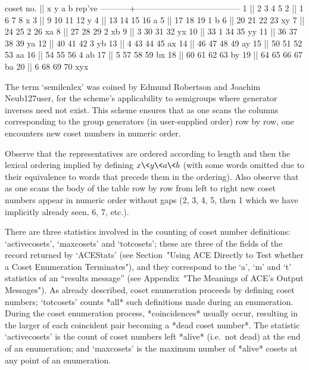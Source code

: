 \begintt
 coset no. ||      x      y      a      b    rep've
-----------+--------------------------------------
         1 ||      2      3      4      5
         2 ||      1      6      7      8    x
         3 ||      9     10     11     12    y
         4 ||     13     14     15     16    a
         5 ||     17     18     19      1    b
         6 ||     20     21     22     23    xy
         7 ||     24     25      2     26    xa
         8 ||     27     28     29      2    xb
         9 ||      3     30     31     32    yx
        10 ||     33      1     34     35    yy
        11 ||     36     37     38     39    ya
        12 ||     40     41     42      3    yb
        13 ||      4     43     44     45    ax
        14 ||     46     47     48     49    ay
        15 ||     50     51     52     53    aa
        16 ||     54     55     56      4    ab
        17 ||      5     57     58     59    bx
        18 ||     60     61     62     63    by
        19 ||     64     65     66     67    ba
        20 ||      6     68     69     70    xyx
\endtt

The term `semilenlex' was  coined  by  Edmund  Robertson  and  Joachim
Neub{\accent127u}ser, for the  scheme's  applicability  to  semigroups
where generator inverses need not exist. This scheme ensures  that  as
one scans the  columns  corresponding  to  the  group  generators  (in
user-supplied order) row by row, one encounters new coset  numbers  in
numeric order. 

Observe that the representatives are ordered according to  length  and
then the lexical ordering implied by defining $x\<y\<a\<b$ (with  some
words omitted due to their equivalence to words that precede  them  in
the ordering). Also observe that as one scans the body  of  the  table
row by row from left to right new  coset  numbers  appear  in  numeric
order without gaps (2, 3, 4,  5,  then  1  which  we  have  implicitly
already seen, 6, 7, etc.).


There are three statistics involved in the counting  of  coset  number
definitions: `activecosets', `maxcosets' and  `totcosets';  these  are
three of  the  fields  of  the  record  returned  by  `ACEStats'  (see
Section~"Using ACE  Directly  to  Test  whether  a  Coset  Enumeration
Terminates"), and they correspond to the `a', `m' and  `t'  statistics
of an {\ACE} ``results message'' (see Appendix~"The Meanings of  ACE's
Output Messages"). As already described, coset enumeration proceeds by
defining coset numbers; `totcosets' counts *all* such definitions made
during  an  enumeration.  During  the   coset   enumeration   process,
*coincidences*  usually  occur,  resulting  in  the  larger  of   each
coincident  pair  becoming  a  *dead  coset  number*.  The   statistic
`activecosets' is the count of coset numbers  left  *alive*  (i.e.~not
dead) at the end of an enumeration; and  `maxcosets'  is  the  maximum
number of *alive* cosets at any point of an enumeration.

